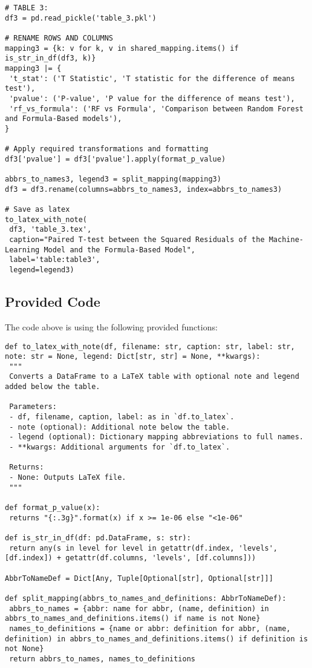\documentclass[11pt]{article}
\begin{document}
\begin{verbatim}
# TABLE 3:
df3 = pd.read_pickle('table_3.pkl')

# RENAME ROWS AND COLUMNS 
mapping3 = {k: v for k, v in shared_mapping.items() if is_str_in_df(df3, k)}
mapping3 |= {
 't_stat': ('T Statistic', 'T statistic for the difference of means test'),
 'pvalue': ('P-value', 'P value for the difference of means test'),
 'rf_vs_formula': ('RF vs Formula', 'Comparison between Random Forest and Formula-Based models'),
}

# Apply required transformations and formatting
df3['pvalue'] = df3['pvalue'].apply(format_p_value)

abbrs_to_names3, legend3 = split_mapping(mapping3)
df3 = df3.rename(columns=abbrs_to_names3, index=abbrs_to_names3)

# Save as latex
to_latex_with_note(
 df3, 'table_3.tex', 
 caption="Paired T-test between the Squared Residuals of the Machine-Learning Model and the Formula-Based Model", 
 label='table:table3', 
 legend=legend3)

\end{verbatim}

\subsection{Provided Code}
The code above is using the following provided functions:

\begin{verbatim}
def to_latex_with_note(df, filename: str, caption: str, label: str, note: str = None, legend: Dict[str, str] = None, **kwargs):
 """
 Converts a DataFrame to a LaTeX table with optional note and legend added below the table.

 Parameters:
 - df, filename, caption, label: as in `df.to_latex`.
 - note (optional): Additional note below the table.
 - legend (optional): Dictionary mapping abbreviations to full names.
 - **kwargs: Additional arguments for `df.to_latex`.

 Returns:
 - None: Outputs LaTeX file.
 """

def format_p_value(x):
 returns "{:.3g}".format(x) if x >= 1e-06 else "<1e-06"

def is_str_in_df(df: pd.DataFrame, s: str):
 return any(s in level for level in getattr(df.index, 'levels', [df.index]) + getattr(df.columns, 'levels', [df.columns]))

AbbrToNameDef = Dict[Any, Tuple[Optional[str], Optional[str]]]

def split_mapping(abbrs_to_names_and_definitions: AbbrToNameDef):
 abbrs_to_names = {abbr: name for abbr, (name, definition) in abbrs_to_names_and_definitions.items() if name is not None}
 names_to_definitions = {name or abbr: definition for abbr, (name, definition) in abbrs_to_names_and_definitions.items() if definition is not None}
 return abbrs_to_names, names_to_definitions

\end{verbatim}
\end{document}
